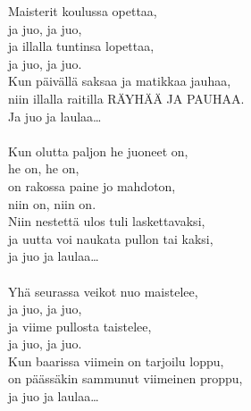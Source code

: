             Maisterit koulussa opettaa, \\
            ja juo, ja juo, \\
            ja illalla tuntinsa lopettaa, \\
            ja juo, ja juo. \\
            Kun päivällä saksaa ja matikkaa jauhaa, \\
            niin illalla raitilla RÄYHÄÄ JA PAUHAA. \\
            Ja juo ja laulaa… \\
\hspace{10mm} \\
            Kun olutta paljon he juoneet on, \\
            he on, he on, \\
            on rakossa paine jo mahdoton, \\
            niin on, niin on. \\
            Niin nestettä ulos tuli laskettavaksi, \\
            ja uutta voi naukata pullon tai kaksi, \\
            ja juo ja laulaa… \\
\hspace{10mm} \\
            Yhä seurassa veikot nuo maistelee, \\
            ja juo, ja juo, \\
            ja viime pullosta taistelee, \\
            ja juo, ja juo. \\
            Kun baarissa viimein on tarjoilu loppu, \\
            on päässäkin sammunut viimeinen proppu, \\
            ja juo ja laulaa… \\
